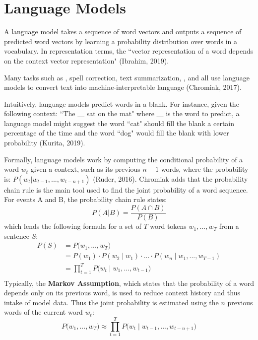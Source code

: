 \section{Language Models} \label{sec:LanguageModels}

A language model takes a sequence of word vectors and outputs a sequence of predicted word vectors by learning a probability distribution over words in a vocabulary. In representation terms, the ``vector representation of a word depends on the context vector representation" (Ibrahim, 2019).

Many tasks such as , spell correction, text summarization, , and  all use language models to convert text into machine-interpretable language (Chromiak, 2017). 

Intuitively, language models predict words in a blank. For instance, given the following context: ``The $\_\_\_$ sat on the mat" where $\_\_\_$ is the word to predict, a language model might suggest the word ``cat" should fill the blank a certain percentage of the time and the word ``dog" would fill the blank with lower probability (Kurita, 2019). 

Formally, language models work by computing the conditional probability of a word $w_t$ given a context, such as its previous $n-1$ words, where the probability is: $P(w_t | w_{t-1}, ..., w_{t-n+1})$ (Ruder, 2016). Chromiak adds that the probability chain rule is the main tool used to find the joint probability of a word sequence. For events A and B, the probability chain rule states:
$$
P(A | B) = \frac{P(A \cap B)} {P(B)}
$$
which lends the following formula for a set of $T$ word tokens $w_1, ..., w_T$ from a sentence $S$: 
$$
\begin{array}{ll}
P(S)
&= P \Big(w_1, ..., w_T \Big)  \\
&= P(w_1) \cdot P(w_2 \; | \; w_1) \cdot ... \cdot P(w_n \; | \; w_1, ..., w_{T-1}) \\
&= \prod_{t=1}^T P \Big(w_t \; | \; w_1, ..., w_{t-1} \Big) \\
\end{array}
$$
Typically, the \textbf{Markov Assumption}, which states that the probability of a word depends only on its previous word, is used to reduce context history and thus intake of model data. Thus the joint probability is estimated using the $n$ previous words of the current word $w_t$:
$$
P \Big(w_1, ..., w_T \Big) \approx \prod_{t=1}^T P \Big(w_t \; | \; w_{t-1}, ..., w_{t-n+1} \Big)
$$

